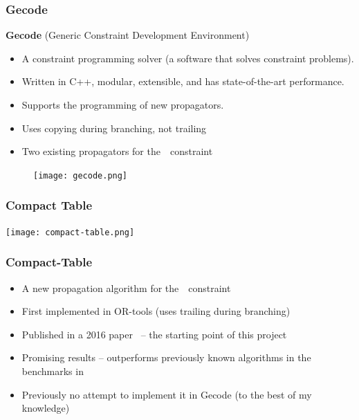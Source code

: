 \documentclass{beamer}
\newcommand{\Table}{\Constraint{Table}}
\newcommand{\CTpaper}[0]{DBLP:conf/cp/DemeulenaereHLP16}
\begin{document}

\begin{frame}

 
  \frametitle{Gecode}
  \textbf{Gecode} (Generic Constraint Development Environment)

  \begin{itemize}
    \item A constraint programming solver (a software that solves constraint problems).
    \item Written in C++, modular, extensible, and has state-of-the-art performance.
    \item Supports the programming of new propagators.
    \item Uses copying during branching, not trailing
    \item   Two existing propagators for the~\Table~constraint
  \end{itemize}

  
    \begin{figure}[t]
    \begin{center}
      \texttt{[image: gecode.png]}
    \end{center}
  \end{figure}


\end{frame}


\begin{frame}
  \frametitle{Compact Table}
  \texttt{[image: compact-table.png]}
\end{frame}

\begin{frame}
  \frametitle{Compact-Table}
  \begin{itemize}
  \item   A new propagation algorithm for the~\Table~constraint
  \item   First implemented in OR-tools (uses trailing during branching)
  \item   Published in a 2016 paper~\cite{\CTpaper} -- the starting
    point of this project
  \item   Promising results -- outperforms previously known 
    algorithms in the
    benchmarks in \cite{\CTpaper}
  \item   Previously no attempt to implement it in Gecode 
    (to the best of my knowledge)
  \end{itemize}

\end{frame}
\end{document}
